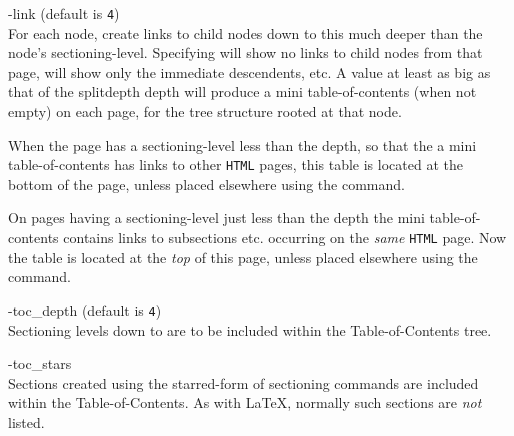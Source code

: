 \begin{htmllist}
%
\item [ -link \Meta{num}\label{cs_linkdepth}]
 (default is \texttt{4})\\
For each node, create links to child nodes down to this much 
deeper than the node's sectioning-level.\html{\\}
Specifying  will show no links to child nodes from that page,\html{\\}
 will show only the immediate descendents, etc.\html{\\}
A value at least as big as that of the 
{splitdepth} depth will
produce a mini table-of-contents (when not empty) on each page,
for the tree structure rooted at that node.%

%

When the page has a sectioning-level less than the  depth,
so that the a mini table-of-contents has links to other \texttt{HTML} pages, 
this table is located at the bottom of the page, 
unless placed elsewhere using the  command.%

%

On pages having a sectioning-level just less than the  depth 
the mini table-of-contents contains links to subsections etc.
occurring on the \emph{same} \texttt{HTML} page. 
Now the table is located at the \emph{top} of this page, 
unless placed elsewhere using the  command.

%

\item [ -toc\_depth  \Meta{num}\label{cs_tocdepth}]
 (default is \texttt{4})\\
Sectioning levels down to  are to be included 
within the Table-of-Contents tree.%

%

\item [ -toc\_stars\label{cs_tocstars}]
\\
Sections created using the starred-form of sectioning commands
are included within the Table-of-Contents.
As with \LaTeX, normally such sections are \emph{not} listed.
%


\end{htmllist}
